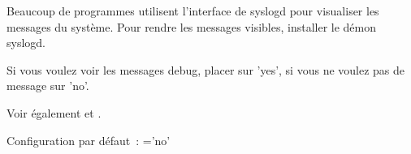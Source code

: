 
  Beaucoup de programmes utilisent l'interface de syslogd pour
  visualiser les messages du système. Pour rendre les messages visibles,
  installer le démon syslogd.

  Si vous voulez voir les messages debug, placer 
  sur 'yes', si vous ne voulez pas de message sur 'no'.

  Voir également  et
  .

  Configuration par défaut~: ='no'

